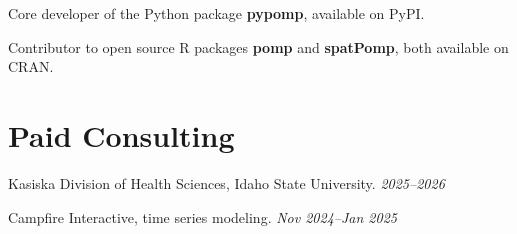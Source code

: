 \documentclass[11pt]{article}
\begin{document}
\vspace{2mm}
\noindent Core developer of the Python package \textbf{pypomp}, available on PyPI.

\vspace{2mm}
\noindent Contributor to open source R packages \textbf{pomp} and \textbf{spatPomp}, both available on CRAN.

\section*{Paid Consulting}

\noindent Kasiska Division of Health Sciences, Idaho State University. \hfill {\textit{2025--2026}}

\noindent Campfire Interactive, time series modeling. \hfill  {\textit{Nov 2024--Jan 2025}}
\end{document}
